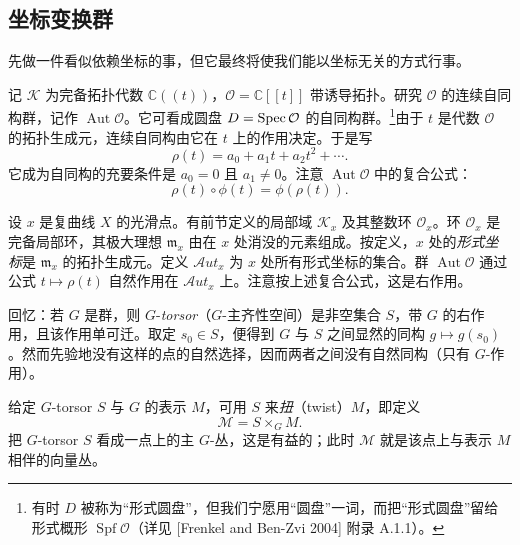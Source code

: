 \subsection{坐标变换群}

先做一件看似依赖坐标的事，但它最终将使我们能以坐标无关的方式行事。

记 $\mathcal{K}$ 为完备拓扑代数 $\mathbb{C}((t))$，$\mathcal{O}=\mathbb{C}[[t]]$ 带诱导拓扑。研究 $\mathcal{O}$ 的连续自同构群，记作 $\operatorname{Aut}\mathcal{O}$。它可看成圆盘 $D=\operatorname{Spec}\mathcal{O}$ 的自同构群。\footnote{有时 $D$ 被称为“形式圆盘”，但我们宁愿用“圆盘”一词，而把“形式圆盘”留给形式概形 $\operatorname{Spf}\mathcal{O}$（详见 [Frenkel and Ben-Zvi 2004] 附录 A.1.1）。}由于 $t$ 是代数 $\mathcal{O}$ 的拓扑生成元，连续自同构由它在 $t$ 上的作用决定。于是写
\[
    \rho(t)=a_0+a_1t+a_2t^2+\cdots.
\]
它成为自同构的充要条件是 $a_0=0$ 且 $a_1\ne 0$。注意 $\operatorname{Aut}\mathcal{O}$ 中的复合公式：
\[
    \rho(t)\circ\phi(t)=\phi(\rho(t)).
\]


设 $x$ 是复曲线 $X$ 的光滑点。有前节定义的局部域 $\mathcal{K}_x$ 及其整数环 $\mathcal{O}_x$。环 $\mathcal{O}_x$ 是完备局部环，其极大理想 $\mathfrak{m}_x$ 由在 $x$ 处消没的元素组成。按定义，$x$ 处的\emph{形式坐标}是 $\mathfrak{m}_x$ 的拓扑生成元。定义 $\mathcal{A}ut_x$ 为 $x$ 处所有形式坐标的集合。群 $\operatorname{Aut}\mathcal{O}$ 通过公式 $t\mapsto\rho(t)$ 自然作用在 $\mathcal{A}ut_x$ 上。注意按上述复合公式，这是右作用。

回忆：若 $G$ 是群，则 $G$-\emph{torsor}（$G$-主齐性空间）是非空集合 $S$，带 $G$ 的右作用，且该作用单可迁。取定 $s_0\in S$，便得到 $G$ 与 $S$ 之间显然的同构 $g\mapsto g(s_0)$。然而先验地没有这样的点的自然选择，因而两者之间没有自然同构（只有 $G$-作用）。

给定 $G$-torsor $S$ 与 $G$ 的表示 $M$，可用 $S$ 来\emph{扭}（twist）$M$，即定义
\[
    \mathcal{M}=S\times_G M .
\]
把 $G$-torsor $S$ 看成一点上的主 $G$-丛，这是有益的；此时 $\mathcal{M}$ 就是该点上与表示 $M$ 相伴的向量丛。

